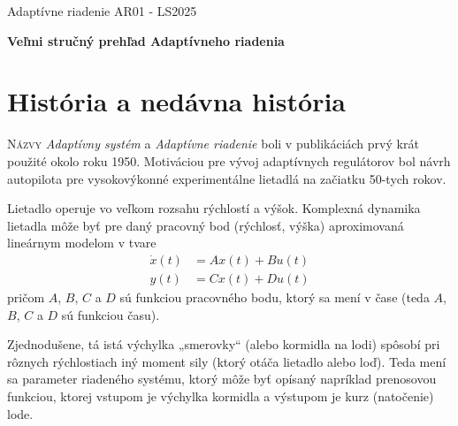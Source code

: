 \documentclass[a4paper, 10pt, ]{article}
\def\oznacenieCasti{AR01 - LS2025}
\begin{document}
\lstset{style=mystyle}




\fontsize{12pt}{22pt}\selectfont

\centerline{\textsf{Adaptívne riadenie} \hfill \textsf{\oznacenieCasti}}

\fontsize{18pt}{22pt}\selectfont






\begin{flushleft}
	\textbf{\textsf{Veľmi stručný prehľad Adaptívneho riadenia}}
\end{flushleft}





\normalsize

\bigskip

{\hypersetup{hidelinks}

\tableofcontents

}

\bigskip

\vspace{18pt}




\section{História a nedávna história}





\lettrine[lines=3, nindent=0pt]N{ázvy} \emph{Adaptívny systém} a \emph{Adaptívne riadenie} boli v publikáciách prvý krát použité okolo roku 1950. Motiváciou pre vývoj adaptívnych regulátorov bol návrh autopilota pre vysokovýkonné experimentálne lietadlá na začiatku 50-tych rokov.

Lietadlo operuje vo veľkom rozsahu rýchlostí a výšok. Komplexná dynamika lietadla môže byť pre daný pracovný bod (rýchlosť, výška) aproximovaná lineárnym modelom v tvare
\begin{subequations}
\begin{align}
	\dot{x}(t) &= A x(t) + B u(t)  \\
	y(t) &= C x(t) + D u(t)
\end{align}
\end{subequations}
pričom $A$, $B$, $C$ a $D$ sú funkciou pracovného bodu, ktorý sa mení v čase (teda $A$, $B$, $C$ a $D$ sú funkciou času).

Zjednodušene, tá istá výchylka „smerovky“ (alebo kormidla na lodi) spôsobí pri rôznych rýchlostiach iný moment sily (ktorý otáča lietadlo alebo loď). Teda mení sa parameter riadeného systému, ktorý môže byť opísaný napríklad prenosovou funkciou, ktorej vstupom je výchylka kormidla a výstupom je kurz (natočenie) lode.
\end{document}
